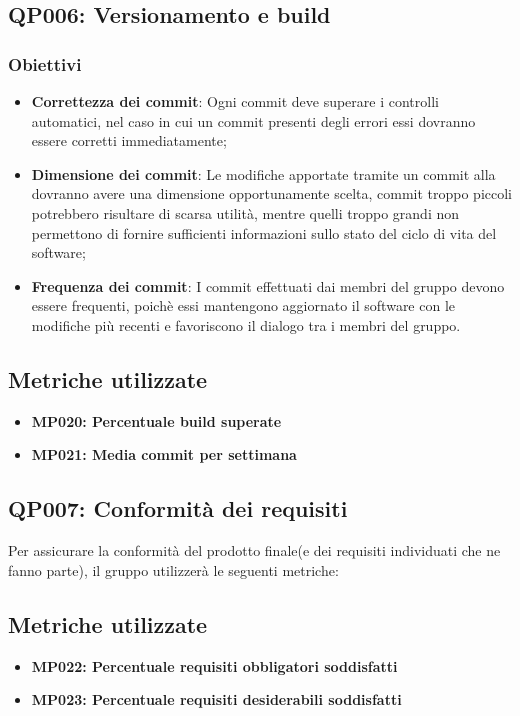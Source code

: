 \subsection{QP006: Versionamento e build}
\subsubsection{Obiettivi}
\begin{itemize}
	\item \textbf{Correttezza dei commit}: Ogni commit deve superare i controlli automatici, nel caso in cui un commit presenti degli errori  essi dovranno essere corretti immediatamente;
	\item \textbf{Dimensione dei commit}: Le modifiche apportate tramite un commit alla  dovranno avere una dimensione opportunamente scelta, commit troppo piccoli potrebbero risultare di scarsa utilità, mentre quelli troppo grandi non permettono di fornire sufficienti informazioni sullo stato del ciclo di vita del software;
	\item  \textbf{Frequenza dei commit}: I commit effettuati dai membri del gruppo devono essere frequenti, poichè essi mantengono aggiornato il software con le modifiche più recenti e favoriscono il dialogo tra i membri del gruppo.

\end{itemize}
\subsection{Metriche utilizzate}
\begin{itemize}
	\item \textbf{MP020: Percentuale build superate}
	\item \textbf{MP021: Media commit per settimana}
\end{itemize}

\subsection{QP007: Conformità dei requisiti}
Per assicurare la conformità del prodotto finale(e dei requisiti individuati che ne fanno parte), il gruppo utilizzerà le seguenti metriche:

\subsection{Metriche utilizzate}
\begin{itemize}
	\item \textbf{MP022: Percentuale requisiti obbligatori soddisfatti}
	\item \textbf{MP023: Percentuale requisiti desiderabili soddisfatti}
\end{itemize}

